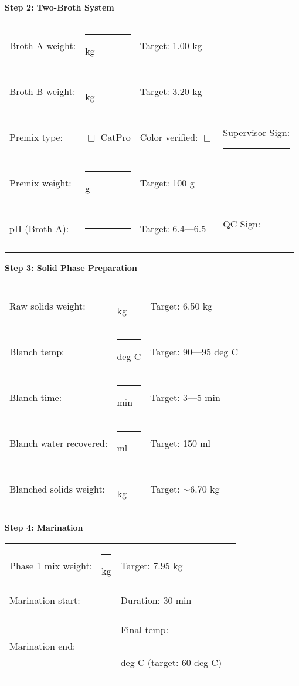 {\vspace{1em}

\noindent\textbf{Step 2: Two-Broth System}

\begin{tabular}{@{}lp{3cm}p{3cm}p{3cm}@{}}
Broth A weight: & \rule{2.5cm}{0.4pt} kg & Target: 1.00 kg & \\
Broth B weight: & \rule{2.5cm}{0.4pt} kg & Target: 3.20 kg & \\
Premix type: & $\Box$ CatPro & Color verified: $\Box$ & Supervisor Sign: \rule{2cm}{0.4pt} \\
Premix weight: & \rule{2.5cm}{0.4pt} g & Target: 100 g & \\
pH (Broth A): & \rule{2.5cm}{0.4pt} & Target: 6.4---6.5 & QC Sign: \rule{2cm}{0.4pt} \\
\end{tabular}

\vspace{1em}

\noindent\textbf{Step 3: Solid Phase Preparation}

\begin{tabular}{@{}lp{3cm}p{3cm}p{3cm}@{}}
Raw solids weight: & \rule{2.5cm}{0.4pt} kg & Target: 6.50 kg & \\
Blanch temp: & \rule{2.5cm}{0.4pt} deg C & Target: 90---95 deg C & \\
Blanch time: & \rule{2.5cm}{0.4pt} min & Target: 3---5 min & \\
Blanch water recovered: & \rule{2.5cm}{0.4pt} ml & Target: 150 ml & \\
Blanched solids weight: & \rule{2.5cm}{0.4pt} kg & Target: $\sim$6.70 kg & \\
\end{tabular}

\vspace{1em}

\noindent\textbf{Step 4: Marination}

\begin{tabular}{@{}lp{3cm}p{3cm}p{3cm}@{}}
Phase 1 mix weight: & \rule{2.5cm}{0.4pt} kg & Target: 7.95 kg & \\
Marination start: & \rule{2.5cm}{0.4pt} & Duration: 30 min & \\
Marination end: & \rule{2.5cm}{0.4pt} & Final temp: \rule{2cm}{0.4pt} deg C (target: 60 deg C) & \\
\end{tabular}

\vspace{1em}

}
